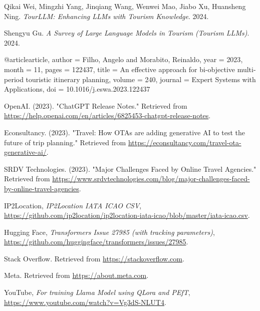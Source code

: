 \documentclass[sigconf,authordraft]{acmart}
\begin{document}
\newpage
\begin{thebibliography}{99}

     Qikai Wei, Mingzhi Yang, Jinqiang Wang, Wenwei Mao, Jiabo Xu, Huansheng Ning. \textit{TourLLM: Enhancing LLMs with Tourism Knowledge}. 2024.

     Shengyu Gu. \textit{A Survey of Large Language Models in Tourism (Tourism LLMs)}. 2024.

        @article{article,
        author = {Filho, Angelo and Morabito, Reinaldo},
        year = {2023},
        month = {11},
        pages = {122437},
        title = {An effective approach for bi-objective multi-period touristic itinerary planning},
        volume = {240},
        journal = {Expert Systems with Applications},
        doi = {10.1016/j.eswa.2023.122437}
        }

        OpenAI. (2023). "ChatGPT Release Notes." Retrieved from \url{https://help.openai.com/en/articles/6825453-chatgpt-release-notes}.

        Econsultancy. (2023). "Travel: How OTAs are adding generative AI to test the future of trip planning." Retrieved from \url{https://econsultancy.com/travel-ota-generative-ai/}.

        SRDV Technologies. (2023). "Major Challenges Faced by Online Travel Agencies." Retrieved from \url{https://www.srdvtechnologies.com/blog/major-challenges-faced-by-online-travel-agencies}.

        IP2Location, \emph{IP2Location IATA ICAO CSV}, \href{https://github.com/ip2location/ip2location-iata-icao/blob/master/iata-icao.csv}{https://github.com/ip2location/ip2location-iata-icao/blob/master/iata-icao.csv}.

        Hugging Face, \emph{Transformers Issue 27985 (with tracking parameters)}, \href{https://github.com/huggingface/transformers/issues/27985}{https://github.com/huggingface/transformers/issues/27985}.

        Stack Overflow. Retrieved from \url{https://stackoverflow.com}.

        Meta. Retrieved from \url{https://about.meta.com}.

        YouTube, \emph{For training Llama Model using QLora and PEfT}, \href{https://www.youtube.com/watch?v=Vg3dS-NLUT4}{https://www.youtube.com/watch?v=Vg3dS-NLUT4}.


\end{thebibliography}
\end{document}
